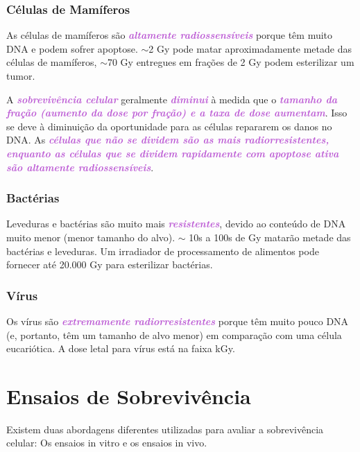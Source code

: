 \documentclass[11pt,a4paper]{article}
\begin{document}
\subsubsection*{Células de Mamíferos}

	As células de mamíferos são \textcolor{MediumOrchid}{\textbf{\textit{altamente radiossensíveis}}} porque têm muito DNA e podem sofrer apoptose. $\sim$2 Gy pode matar aproximadamente metade das células de mamíferos, $\sim$70 Gy entregues em frações de 2 Gy podem esterilizar um tumor.

	A \textcolor{MediumOrchid}{\textbf{\textit{sobrevivência celular}}} geralmente \textcolor{MediumOrchid}{\textbf{\textit{diminui}}} à medida que o \textcolor{MediumOrchid}{\textbf{\textit{tamanho da fração (aumento da dose por fração) e a taxa de dose aumentam}}}. Isso se deve à diminuição da oportunidade para as células repararem os danos no DNA. As \textcolor{MediumOrchid}{\textbf{\textit{células que não se dividem são as mais radiorresistentes, enquanto as células que se dividem rapidamente com apoptose ativa são altamente radiossensíveis}}}.

\subsubsection*{Bactérias}

	Leveduras e bactérias são muito mais \textcolor{MediumOrchid}{\textbf{\textit{resistentes}}}, devido ao conteúdo de DNA muito menor (menor tamanho do alvo). $\sim$ 10s a 100s de Gy matarão metade das bactérias e leveduras. Um irradiador de processamento de alimentos pode fornecer até 20.000 Gy para esterilizar bactérias. 

\subsubsection*{Vírus}

	Os vírus são \textcolor{MediumOrchid}{\textbf{\textit{extremamente radiorresistentes}}} porque têm muito pouco DNA (e, portanto, têm um tamanho de alvo menor) em comparação com uma célula eucariótica. A dose letal para vírus está na faixa kGy.

\section{Ensaios de Sobrevivência}

	Existem duas abordagens diferentes utilizadas para avaliar a sobrevivência celular: Os ensaios in vitro e os ensaios in vivo.
\end{document}
